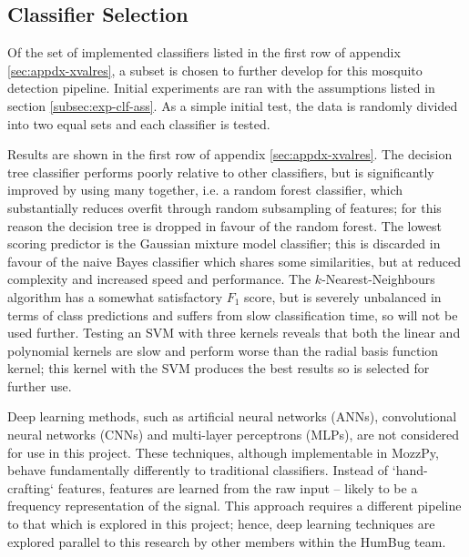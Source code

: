       
     
    \subsection{Classifier Selection}
    \label{subsec:exp-clf-select}
        Of the set of implemented classifiers listed in the first row of appendix \ref{sec:appdx-xvalres}, a subset is chosen to further develop for this mosquito detection pipeline. Initial experiments are ran with the assumptions listed in section \ref{subsec:exp-clf-ass}. As a simple initial test, the data is randomly divided into two equal sets and each classifier is tested.
        
        Results are shown in the first row of appendix \ref{sec:appdx-xvalres}. The decision tree classifier performs poorly relative to other classifiers, but is significantly improved by using many together, i.e. a random forest classifier, which substantially reduces overfit through random subsampling of features; for this reason the decision tree is dropped in favour of the random forest. The lowest scoring predictor is the Gaussian mixture model classifier; this is discarded in favour of the naive Bayes classifier which shares some similarities, but at reduced complexity and increased speed and performance. The $k$-Nearest-Neighbours algorithm has a somewhat satisfactory $F_1$ score, but is severely unbalanced in terms of class predictions and suffers from slow classification time, so will not be used further. Testing an SVM with three kernels reveals that both the linear and polynomial kernels are slow and perform worse than the radial basis function kernel; this kernel with the SVM produces the best results so is selected for further use.
        
        Deep learning methods, such as artificial neural networks (ANNs), convolutional neural networks (CNNs) and multi-layer perceptrons (MLPs), are not considered for use in this project. These techniques, although implementable in MozzPy, behave fundamentally differently to traditional classifiers. Instead of `hand-crafting` features, features are learned from the raw input -- likely to be a frequency representation of the signal. This approach requires a different pipeline to that which is explored in this project; hence, deep learning techniques are explored parallel to this research by other members within the HumBug team.
        
